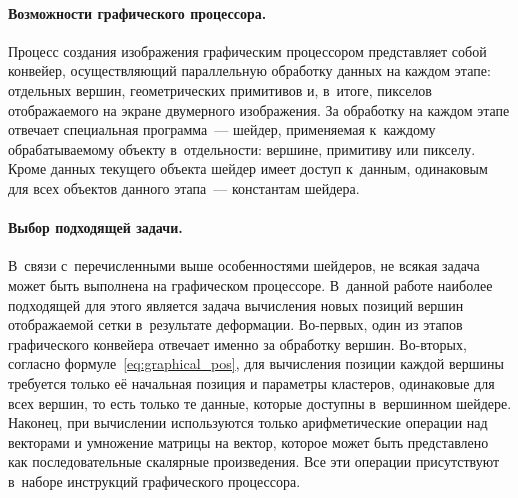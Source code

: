 \documentclass[a4paper, 14pt, titlepage]{extarticle}
\begin{document}
        \paragraph{Возможности графического процессора.}
        Процесс создания изображения графическим процессором представляет собой конвейер,
        осуществляющий параллельную обработку данных на каждом этапе: отдельных вершин,
        геометрических примитивов и, в~итоге, пикселов отображаемого на экране двумерного
        изображения. За обработку на каждом этапе отвечает специальная программа~--- шейдер,
        применяемая к~каждому обрабатываемому объекту в~отдельности: вершине, примитиву или пикселу.
        Кроме данных текущего объекта шейдер имеет доступ к~данным, одинаковым для всех объектов
        данного этапа~--- константам шейдера.

        \paragraph{Выбор подходящей задачи.}
        В~связи с~перечисленными выше особенностями шейдеров, не всякая задача может быть выполнена
        на графическом процессоре. В~данной работе наиболее подходящей для этого является задача
        вычисления новых позиций вершин отображаемой сетки в~результате деформации. Во-первых, один
        из этапов графического конвейера отвечает именно за обработку вершин. Во-вторых, согласно
        формуле~\eqref{eq:graphical_pos}, для вычисления позиции каждой вершины требуется только её
        начальная позиция и параметры кластеров, одинаковые для всех вершин, то есть только те
        данные, которые доступны в~вершинном шейдере. Наконец, при вычислении используются только
        арифметические операции над векторами и умножение матрицы на вектор, которое может быть
        представлено как последовательные скалярные произведения. Все эти операции присутствуют
        в~наборе инструкций графического процессора.
\end{document}
